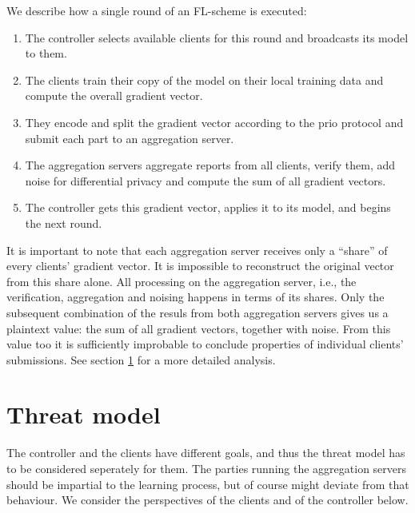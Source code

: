 \documentclass{article}
\begin{document}
We describe how a single round of an FL-scheme is executed:
\begin{enumerate}[itemsep=0mm]
\item The controller selects available clients for this round and broadcasts its model to them.
\item The clients train their copy of the model on their local training data and
  compute the overall gradient vector.
\item They encode and split the gradient vector according to the prio protocol
  and submit each part to an aggregation server.
\item The aggregation servers aggregate reports from all clients, verify them,
  add noise for differential privacy and compute the sum of all gradient vectors.
\item The controller gets this gradient vector, applies it to its model, and
  begins the next round.
\end{enumerate}
It is important to note that each aggregation server receives only a ``share''
of every clients' gradient vector. It is impossible to reconstruct the original
vector from this share alone. All processing on the aggregation server, i.e.,
the verification, aggregation and noising happens in terms of its shares.
Only the subsequent combination of the resuls from both aggregation servers gives
us a plaintext value: the sum of all gradient vectors, together with noise. From
this value too it is sufficiently improbable to conclude properties of
individual clients' submissions. See section \ref{} for a more detailed analysis.

\section{Threat model}
The controller and the clients have different goals, and thus the threat model
has to be considered seperately for them. The parties running the aggregation
servers should be impartial to the learning process, but of course might deviate
from that behaviour. We consider the perspectives of the clients
and of the controller below.
\end{document}
